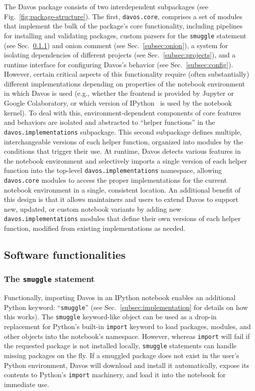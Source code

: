 \documentclass[preprint,12pt,a4paper]{elsarticle}
\begin{document}
The Davos package consists of two interdependent subpackages
(see Fig.~\ref{fig:package-structure}). The first,
\texttt{davos.core}, comprises a set of modules that
implement the bulk of the package's core
functionality, including pipelines for installing and validating
packages, custom parsers for the \texttt{smuggle} statement (see
Sec.~\ref{subsec:smuggle}) and onion comment (see
Sec.~\ref{subsec:onion}), a system for isolating dependencies of
different projects (see Sec.~\ref{subsec:projects}), and a runtime
interface for configuring Davos's behavior (see Sec.~\ref{subsec:config}).
However, certain critical aspects of this
functionality require (often substantially) different implementations
depending on properties of the notebook environment in which
Davos is used (e.g., whether the frontend is provided by
Jupyter or Google Colaboratory, or which version of
IPython~\cite{PereGran07} is used by the notebook kernel). To deal
with this, environment-dependent components of core features and behaviors
are isolated and abstracted to ``helper functions'' in the
\texttt{davos.implementations} subpackage. This second subpackage
defines multiple, interchangeable versions of each helper function,
organized into modules by the conditions that trigger their use. At
runtime, Davos detects various features in the notebook
environment and selectively imports a single version of each helper
function into the top-level \texttt{davos.implementations} namespace,
allowing \texttt{davos.core} modules to access the proper
implementations for the current notebook environment in a single,
consistent location. An additional benefit of this design is that it
allows maintainers and users to extend Davos to
support new, updated, or custom notebook variants by adding new
\texttt{davos.implementations} modules that define their own versions
of each helper function, modified from existing implementations as
needed.


\subsection{Software functionalities}

\subsubsection{The \texttt{smuggle} statement}\label{subsec:smuggle}

Functionally, importing Davos in an IPython notebook enables
an additional Python keyword: ``\texttt{smuggle}'' (see
Sec.~\ref{subsec:implementation} for details on how this works).
The \texttt{smuggle} keyword-like object can be used as a drop-in
replacement for Python's built-in \texttt{import} keyword to load
packages, modules, and other objects into the notebook's namespace.
However, whereas \texttt{import} will fail if the requested package is
not installed locally, \texttt{smuggle} statements can handle missing
packages on the fly.  If a smuggled package does not exist in the
user's Python environment, Davos will download and install it automatically,
expose its contents to Python's \texttt{import} machinery, and load it
into the notebook for immediate use.
\end{document}
